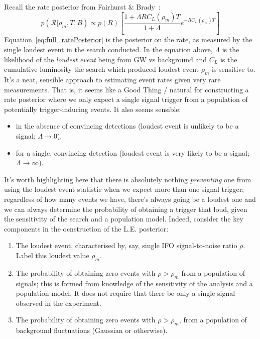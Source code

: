 \documentclass[nofootinbib]{revtex4}
\newcommand{\cbcrate}{{{\mathcal R}}}
\begin{document}
Recall the rate posterior from Fairhurst \& Brady~\cite{BradyFairhurst08}:
\begin{equation}\label{eq:full_ratePosterior}
p(\cbcrate|\rho_m, T, B) \propto p(R) \left[ \frac{1+\Lambda R
C_L(\rho_m)T}{1+\Lambda} e^{-RC_L(\rho_m)T}\right]
\end{equation}
%
Equation~\ref{eq:full_ratePosterior} is the posterior on the rate, as measured
by the single loudest event in the search conducted.  In the equation above,
$\Lambda$ is the likelihood of the \emph{loudest event} being from GW vs
background and $C_L$ is the cumulative luminosity the search which produced
loudest event $\rho_m$ is sensitive to.  It's a neat, sensible approach to
estimating event rates given very rare measurements.  That is, it seems like a
Good Thing / natural for constructing a rate posterior where we only expect a
single signal trigger from a population of potentially trigger-inducing events.
It also seems sensible:
%
\begin{itemize}
\item in the absence of convincing detections (loudest event is unlikely to be a
signal; $\Lambda \rightarrow 0$),
\item for a single, convincing detection (loudest event is very likely to be a
signal; $\Lambda \rightarrow \infty$).
\end{itemize}
%
It's worth highlighting here that there is absolutely nothing \emph{preventing}
one from using the loudest event statistic when we expect more than one signal
trigger; regardless of how many events we have, there's always going be a
loudest one and we can always determine the probability of obtaining a trigger
that loud, given the sensitivity of the search and a population model.  Indeed,
consider the key components in the ocnstruction of the L.E. posterior:
%
\begin{enumerate}
\item The loudest event, characterised by, say, single IFO signal-to-noise ratio
$\rho$.  Label this loudest value $\rho_m$.
\item The probability of obtaining zero events with $\rho>\rho_m$ from a
population of signals; this is formed from knowledge of the sensitivity of the
analysis and a population model.  It does not require that there be only a
single signal observed in the experiment.
\item The probability of obtaining zero events with $\rho>\rho_m$, from a
population of background fluctuations (Gaussian or otherwise).
\end{enumerate}
\end{document}

